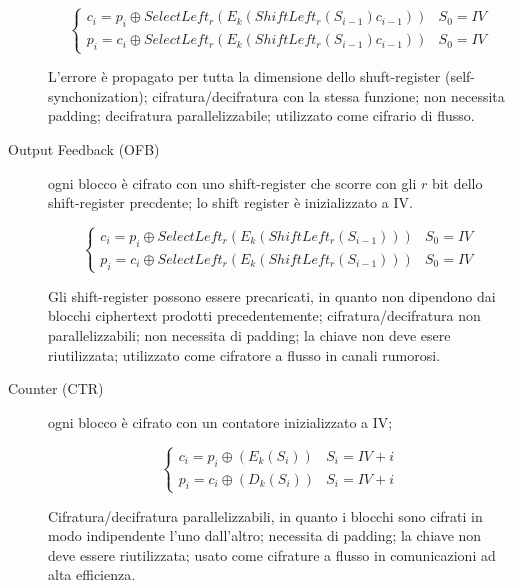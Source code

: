 \begin{description}
  \begin{equation}
  \begin{cases}
    c_{i}=p_{i} \oplus SelectLeft_{r}(E_{k}(ShiftLeft_{r}(S_{i-1})c_{i-1})) & S_{0}=IV \\
    p_{i}=c_{i} \oplus SelectLeft_{r}(E_{k}(ShiftLeft_{r}(S_{i-1})c_{i-1})) & S_{0}=IV
  \end{cases}
  \end{equation}

  L'errore è propagato per tutta la dimensione dello shuft-register (self-synchonization); cifratura/decifratura con la stessa funzione; non necessita padding; decifratura parallelizzabile; utilizzato come cifrario di flusso.

  \item[Output Feedback (OFB)] ogni blocco è cifrato con uno shift-register che scorre con gli $r$ bit dello shift-register precdente; lo shift register è inizializzato a IV.

  \begin{equation}
  \begin{cases}
    c_{i}=p_{i} \oplus SelectLeft_{r}(E_{k}(ShiftLeft_{r}(S_{i-1}))) & S_{0}=IV \\
    p_{i}=c_{i} \oplus SelectLeft_{r}(E_{k}(ShiftLeft_{r}(S_{i-1}))) & S_{0}=IV
  \end{cases}
  \end{equation}

  Gli shift-register possono essere precaricati, in quanto non dipendono dai blocchi ciphertext prodotti precedentemente; cifratura/decifratura non parallelizzabili; non necessita di padding; la chiave non deve esere riutilizzata; utilizzato come cifratore a flusso in canali rumorosi.

  \item[Counter (CTR)] ogni blocco è cifrato con un contatore inizializzato a IV;

  \begin{equation}
  \begin{cases}
    c_{i}=p_{i} \oplus (E_{k}(S_{i})) & S_{i}=IV+i\\
    p_{i}=c_{i} \oplus (D_{k}(S_{i})) & S_{i}=IV+i
  \end{cases}
  \end{equation}

  Cifratura/decifratura parallelizzabili, in quanto i blocchi sono cifrati in modo indipendente l'uno dall'altro; necessita di padding; la chiave non deve essere riutilizzata; usato come cifrature a flusso in comunicazioni ad alta efficienza.

\end{description}
